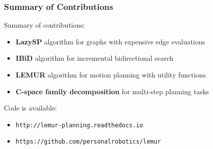 \begin{frame}
   \frametitle{Summary of Contributions}

   Summary of contributions:
   \begin{itemize}
   \pause \item {\bf LazySP} algorithm for graphs with expensive edge evaluations
   \pause \item {\bf IBiD} algorithm for incremental bidirectional search
   \pause \item {\bf LEMUR} algorithm for motion planning with utility functions
   \pause \item {\bf C-space family decomposition} for multi-step planning tasks
   \end{itemize}

   \pause
   Code is available:
   \begin{itemize}
   \item {\tt http://lemur-planning.readthedocs.io}
   \item {\tt https://github.com/personalrobotics/lemur}
   \end{itemize}



   
\end{frame}

